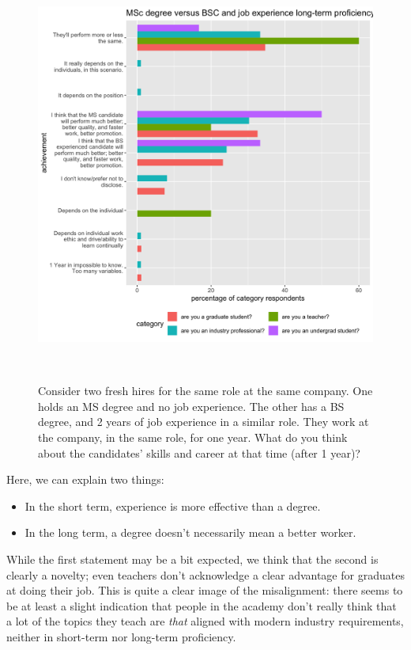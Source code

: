 \documentclass{sigchi}
\begin{document}
\begin{figure}
\includegraphics[scale=0.2]{../data-analysis/plots_output/MSc_degree_versus_BSC_and_job_experience_long-term_proficiency.png}
 \caption{Consider two fresh hires for the same role at the same company. One holds an MS degree and no job experience. The other has a BS degree, and 2 years of job experience in a similar role. They work at the company, in the same role, for one year. What do you think about the candidates' skills and career at that time (after 1 year)?}~\label{fig:figure11}
\end{figure}

Here, we can explain two things:
\begin{itemize}
	\item In the short term, experience is more effective than a degree.
	\item In the long term, a degree doesn't necessarily mean a better worker.	
\end{itemize}

While the first statement may be a bit expected, we think that the second is clearly a novelty; even teachers don't acknowledge a clear advantage for graduates at doing their job. This is quite a clear image of the misalignment: there seems to be at least a slight indication that people in the academy don't really think that a lot of the topics they teach are \textit{that} aligned with modern industry requirements, neither in short-term nor long-term proficiency.
\end{document}
